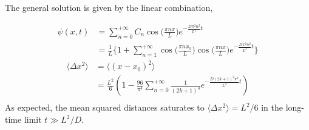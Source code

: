 The general solution is given by the linear combination,

\begin{align*}
  \psi(x,t) &= \sum_{n=0}^{+\infty} C_n \cos\Big(\frac{\pi n x}{L}\Big) e^{- \frac{D\pi^2
  n^2}{L^2}t}\\
            &=\frac{1}{L} \Bigg\{ 1 + \sum_{n=1}^{+\infty} \cos\Big(\frac{\pi n
  x_0}{L}\Big) \cos\Big(\frac{\pi n x}{L}\Big) e^{- \frac{D\pi^2  n^2}{L^2}t}\Bigg\}
\end{align*}
\begin{align*}
  \langle \Delta x^2 \rangle &= \langle(x-x_0)^2\rangle\\&= \frac{L^2}{6}(1 -
  \frac{96}{\pi^4}
  \sum_{n=0}^{+\infty} \frac{1}{(2k+1)^4} e^{- \frac{D(2k+1)^2 \pi^2}{L^2}t})\\
\end{align*}
As expected, the mean squared distances saturates to $\langle \Delta x^2 \rangle = L^2/6$
in the long-time limit $t \gg L^2 / D.$
